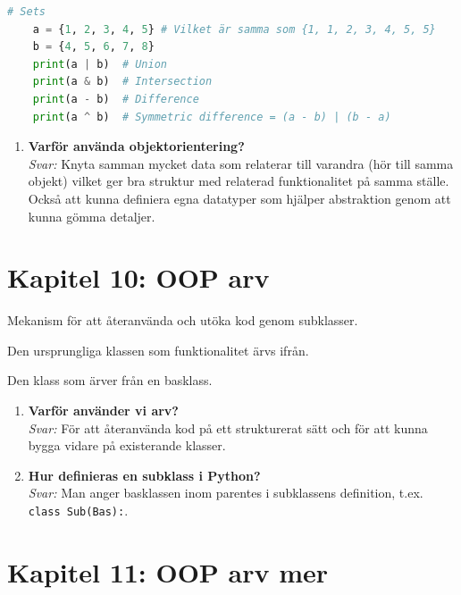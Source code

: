 \documentclass[11pt,a4paper]{article}
\begin{document}
\begin{lstlisting}[language=Python]
    # Sets
    a = {1, 2, 3, 4, 5} # Vilket är samma som {1, 1, 2, 3, 4, 5, 5}
    b = {4, 5, 6, 7, 8}
    print(a | b)  # Union
    print(a & b)  # Intersection
    print(a - b)  # Difference
    print(a ^ b)  # Symmetric difference = (a - b) | (b - a)
\end{lstlisting}

\begin{enumerate}[label=\bfseries\color{primary}Fråga \arabic*:, leftmargin=1.8cm]
    \item \textbf{Varför använda objektorientering?}
    \\ \textit{Svar:} Knyta samman mycket data som relaterar till varandra (hör till samma objekt) vilket ger bra struktur med relaterad funktionalitet på samma ställe. Också att kunna definiera egna datatyper som hjälper abstraktion genom att kunna gömma detaljer.
\end{enumerate}

\section{Kapitel 10: OOP arv}
\begin{description}[style=nextline, leftmargin=1cm, labelindent=0.5cm]
    \item[\color{primary}Arv] Mekanism för att återanvända och utöka kod genom subklasser.
    \item[\color{primary}Basklass] Den ursprungliga klassen som funktionalitet ärvs ifrån.
    \item[\color{primary}Subklass] Den klass som ärver från en basklass.
\end{description}

\begin{enumerate}[label=\bfseries\color{primary}Fråga \arabic*:, leftmargin=1.8cm]
    \item \textbf{Varför använder vi arv?}
    \\ \textit{Svar:} För att återanvända kod på ett strukturerat sätt och för att kunna bygga vidare på existerande klasser.
    
    \item \textbf{Hur definieras en subklass i Python?}
    \\ \textit{Svar:} Man anger basklassen inom parentes i subklassens definition, t.ex. \texttt{class Sub(Bas):}.
\end{enumerate}

\section{Kapitel 11: OOP arv mer}
\end{document}
